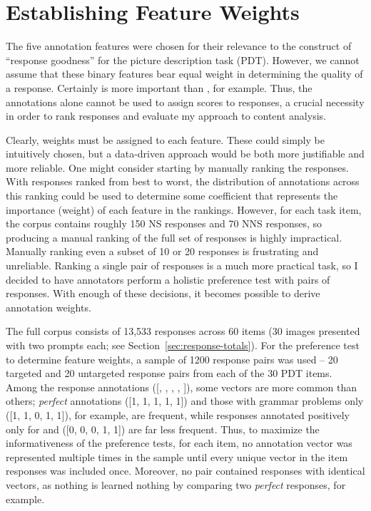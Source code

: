 \section{Establishing Feature Weights}
\label{sec:est-feat-weights}

The five annotation features were chosen for their relevance to the construct of ``response goodness'' for the picture description task (PDT). However, we cannot assume that these binary features bear equal weight in determining the quality of a response. Certainly  is more important than , for example. Thus, the annotations alone cannot be used to assign scores to responses, a crucial necessity in order to rank responses and evaluate my approach to content analysis.

Clearly, weights must be assigned to each feature. These could simply be intuitively chosen, but a data-driven approach would be both more justifiable and more reliable. One might consider starting by manually ranking the responses. With responses ranked from best to worst, the distribution of annotations across this ranking could be used to determine some coefficient that represents the importance (weight) of each feature in the rankings. However, for each task item, the corpus contains roughly 150 NS responses and 70 NNS responses, so producing a manual ranking of the full set of responses is highly impractical. Manually ranking even a subset of 10 or 20 responses is frustrating and unreliable. Ranking a single pair of responses is a much more practical task, so I decided to have annotators perform a holistic preference test with pairs of responses. With enough of these decisions, it becomes possible to derive annotation weights.

The full corpus consists of 13,533 responses across 60 items (30 images presented with two prompts each; see Section~\ref{sec:response-totals}). For the preference test to determine feature weights, a sample of 1200 response pairs was used -- 20 targeted and 20 untargeted response pairs from each of the 30 PDT items. Among the response annotations  ([, , , , ]), some vectors are more common than others; \textit{perfect} annotations ([1, 1, 1, 1, 1]) and those with grammar problems only ([1, 1, 0, 1, 1]), for example, are frequent, while responses annotated positively only for  and  ([0, 0, 0, 1, 1]) are far less frequent. Thus, to maximize the informativeness of the preference tests, for each item, no annotation vector was represented multiple times in the sample until every unique vector in the item responses was included once. Moreover, no pair contained responses with identical vectors, as nothing is learned nothing by comparing two \textit{perfect} responses, for example.

